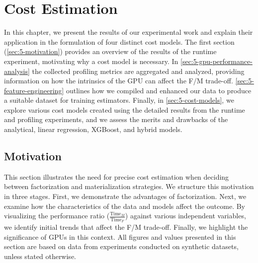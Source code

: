 
\chapter{Cost Estimation}

\label{chapter:cost-estimation}
In this chapter, we present the results of our experimental work and explain their application in the formulation of four distinct cost models. The first section (\autoref{sec:5-motivation}) provides an overview of the results of the runtime experiment, motivating why a cost model is necessary. In \autoref{sec:5-gpu-performance-analysis} the collected profiling metrics are aggregated and analyzed, providing information on how the intrinsics of the GPU can affect the F/M trade-off. \autoref{sec:5-feature-engineering} outlines how we compiled and enhanced our data to produce a suitable dataset for training estimators. Finally, in \autoref{sec:5-cost-models}, we explore various cost models created using the detailed results from the runtime and profiling experiments, and we assess the merits and drawbacks of the analytical, linear regression, XGBoost, and hybrid models.

\section{Motivation}
\label{sec:5-motivation}

This section illustrates the need for precise cost estimation when deciding between factorization and materialization strategies. We structure this motivation in three stages. First, we demonstrate the advantages of factorization. Next, we examine how the characteristics of the data and models affect the outcome. By visualizing the performance ratio ($\frac{\text{Time}_M}{\text{Time}_F}$) against various independent variables, we identify initial trends that affect the F/M trade-off. Finally, we highlight the significance of GPUs in this context. All figures and values presented in this section are based on data from experiments conducted on synthetic datasets, unless stated otherwise.

